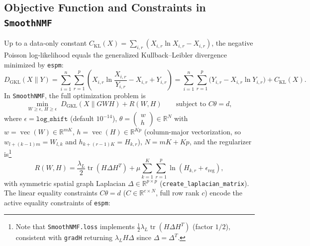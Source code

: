 \documentclass[11pt,a4paper]{article}
\theoremstyle{plain}
\theoremstyle{definition}
\theoremstyle{remark}
\newcommand{\R}{\mathbb{R}}
\newcommand{\vecop}{\operatorname{vec}}
\newcommand{\tr}{\operatorname{tr}}
\begin{document}
\subsection{Objective Function and Constraints in \texttt{SmoothNMF}}
Up to a data-only constant $C_{\text{KL}}(X) = \sum_{i,r}(X_{i,r}\ln X_{i,r} - X_{i,r})$, the negative Poisson log-likelihood equals the generalized Kullback--Leibler divergence minimized by \texttt{espm}:
\begin{equation}
\label{eq:d_gkl}
D_{\text{GKL}}(X \| Y) = \sum_{i=1}^n \sum_{r=1}^p \left( X_{i,r} \ln \frac{X_{i,r}}{Y_{i,r}} - X_{i,r} + Y_{i,r} \right) = \sum_{i=1}^n \sum_{r=1}^p \big( Y_{i,r} - X_{i,r}\ln Y_{i,r} \big) + C_{\text{KL}}(X).
\end{equation}
In \texttt{SmoothNMF}, the full optimization problem is
\begin{equation}
\label{eq:smoothnmf_obj}
\min_{W \ge \epsilon,\, H \ge \epsilon} \; D_{\text{GKL}}(X \| GWH) + R(W,H) \qquad \text{subject to } C\theta = d,
\end{equation}
where $\epsilon = \texttt{log\_shift}$ (default $10^{-14}$), $\theta = \begin{pmatrix} w \\ h \end{pmatrix} \in \R^N$ with $w = \vecop(W) \in \R^{mK}$, $h = \vecop(H) \in \R^{Kp}$ (column-major vectorization, so $w_{l + (k-1)m} = W_{l,k}$ and $h_{k + (r-1)K} = H_{k,r}$), $N = mK + Kp$, and the regularizer is\footnote{Note that \texttt{SmoothNMF.loss} implements $\frac{1}{2}\lambda_L \operatorname{tr}(H \Delta H^T)$ (factor $1/2$), consistent with \texttt{gradH} returning $\lambda_L H \Delta$ since $\Delta = \Delta^T$.}
\begin{equation}
\label{eq:regularizer}
R(W,H) = \frac{\lambda_L}{2} \tr(H \Delta H^T) + \mu \sum_{k=1}^K \sum_{r=1}^p \ln(H_{k,r} + \epsilon_{\text{reg}}),
\end{equation}
with symmetric spatial graph Laplacian $\Delta \in \R^{p \times p}$ (\texttt{create\_laplacian\_matrix}). The linear equality constraints $C\theta = d$ ($C \in \R^{c \times N}$, full row rank $c$) encode the active equality constraints of \texttt{espm}:
\end{document}
